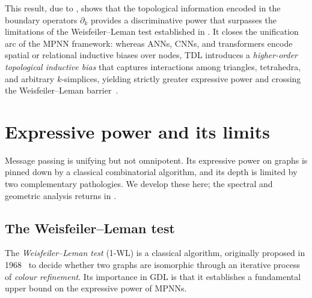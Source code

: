This result, due to \citet{bodnar2021weisfeiler}, shows that the topological
information encoded in the boundary operators $\partial_k$ provides a
discriminative power that surpasses the limitations of the Weisfeiler--Leman
test established in . It closes the unification arc of the
MPNN framework: whereas ANNs, CNNs, and transformers encode spatial or
relational inductive biases over nodes, TDL introduces a \emph{higher-order
topological inductive bias} that captures interactions among triangles,
tetrahedra, and arbitrary $k$-simplices, yielding strictly greater expressive
power and crossing the Weisfeiler--Leman
barrier~\citep{bodnar2021weisfeiler, hajij2023topological}.

\section{Expressive power and its limits}
\label{sec:priors:expressivity-limits}

Message passing is unifying but not omnipotent. Its expressive power on graphs is
pinned down by a classical combinatorial algorithm, and its depth is limited by
two complementary pathologies. We develop these here; the spectral and geometric
analysis returns in .

\subsection{The Weisfeiler--Leman test}
\label{sec:priors:wl}

The \emph{Weisfeiler--Leman test} (1-WL) is a classical algorithm, originally
proposed in 1968~\citep{weisfeiler1968reduction} to decide whether two graphs are
isomorphic through an iterative process of \emph{colour refinement}. Its
importance in GDL is that it establishes a fundamental upper bound on the
expressive power of MPNNs.

